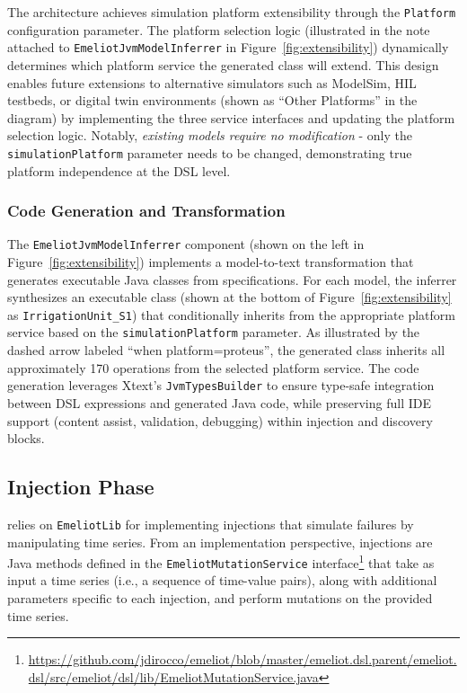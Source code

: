 The architecture achieves simulation platform extensibility through the \texttt{Platform} configuration parameter. The platform selection logic (illustrated in the note attached to \texttt{EmeliotJvmModelInferrer} in Figure~\ref{fig:extensibility}) dynamically determines which platform service the generated class will extend. This design enables future extensions to alternative simulators such as ModelSim, HIL testbeds, or digital twin environments (shown as ``Other Platforms'' in the diagram) by implementing the three service interfaces and updating the platform selection logic. Notably, \textit{existing \tool models require no modification} - only the \texttt{simulationPlatform} parameter needs to be changed, demonstrating true platform independence at the DSL level.


\subsubsection{Code Generation and Transformation}
The \texttt{EmeliotJvmModelInferrer} component (shown on the left in Figure~\ref{fig:extensibility}) implements a model-to-text transformation that generates executable Java classes from \tool specifications. For each model, the inferrer synthesizes an executable class (shown at the bottom of Figure~\ref{fig:extensibility} as \texttt{IrrigationUnit\_S1}) that conditionally inherits from the appropriate platform service based on the \texttt{simulationPlatform} parameter. As illustrated by the dashed arrow labeled ``when platform=proteus'', the generated class inherits all approximately 170 operations from the selected platform service. The code generation leverages Xtext's \texttt{JvmTypesBuilder} to ensure type-safe integration between DSL expressions and generated Java code, while preserving full IDE support (content assist, validation, debugging) within injection and discovery blocks.



\subsection{Injection Phase}
\label{sec:injection}


\tool relies on \texttt{EmeliotLib} for implementing injections that simulate failures by manipulating time series. From an implementation perspective, injections are Java methods defined in the \texttt{EmeliotMutationService} interface\footnote{\url{https://github.com/jdirocco/emeliot/blob/master/emeliot.dsl.parent/emeliot.dsl/src/emeliot/dsl/lib/EmeliotMutationService.java}} that take as input a time series (i.e., a sequence of time-value pairs), along with additional parameters specific to each injection, and perform mutations on the provided time series.

